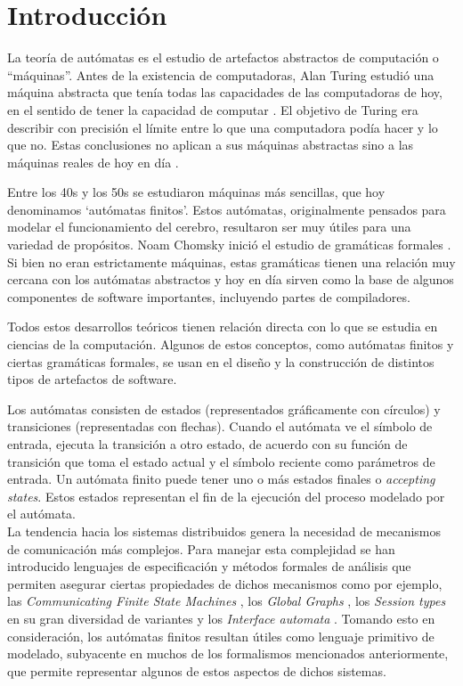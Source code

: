 \chapter{Introducción}
La teoría de autómatas es el estudio de artefactos abstractos de computación o ``máquinas''. Antes de la existencia de computadoras, Alan Turing estudió una máquina abstracta que tenía todas las capacidades de las computadoras de hoy, en el sentido de tener la capacidad de computar \cite{turing:plms-s2-42_1,turing:plms-s2-43_1}. El objetivo de Turing era describir con precisión el límite entre lo que una computadora podía hacer y lo que no. Estas conclusiones no aplican a sus máquinas abstractas sino a las máquinas reales de hoy en día \cite{ullman}.

Entre los 40s y los 50s se estudiaron máquinas más sencillas, que hoy denominamos `autómatas finitos'. Estos autómatas, originalmente pensados para modelar el funcionamiento del cerebro, resultaron ser muy útiles para una variedad de propósitos. Noam Chomsky inició el estudio de gramáticas formales \cite{chomsky:iretit-2_3}. Si bien no eran estrictamente máquinas, estas gramáticas tienen una relación muy cercana con los autómatas abstractos y hoy en día sirven como la base de algunos componentes de software importantes, incluyendo partes de compiladores.

Todos estos desarrollos teóricos tienen relación directa con lo que se estudia en ciencias de la computación. Algunos de estos conceptos, como autómatas finitos y ciertas gramáticas formales, se usan en el diseño y la construcción de distintos tipos de artefactos de software.

Los autómatas consisten de estados (representados gráficamente con círculos) y transiciones (representadas con flechas). Cuando el autómata ve el símbolo de entrada, ejecuta la transición a otro estado, de acuerdo con su función de transición que toma el estado actual y el símbolo reciente como parámetros de entrada. Un autómata finito puede tener uno o más estados finales o \emph{accepting states}. Estos estados representan el fin de la ejecución del proceso modelado por el autómata.\\

La tendencia hacia los sistemas distribuidos genera la necesidad de mecanismos de comunicación más complejos. Para manejar esta complejidad se han introducido lenguajes de especificación y métodos formales de análisis que permiten asegurar ciertas propiedades de dichos mecanismos como por ejemplo, las \emph{Communicating Finite State Machines} \cite{brand:jacm-30_2}, los \emph{Global Graphs} \cite{castagna:lmcs-8_1}, los \emph{Session types} en su gran diversidad de variantes \cite{honda:esop98,honda:popl08} y los \emph{Interface automata} \cite{dealfaro:esec-fse-01}. Tomando esto en consideración, los autómatas finitos resultan útiles como lenguaje primitivo de modelado, subyacente en muchos de los formalismos mencionados anteriormente, que permite representar algunos de estos aspectos de dichos sistemas.

